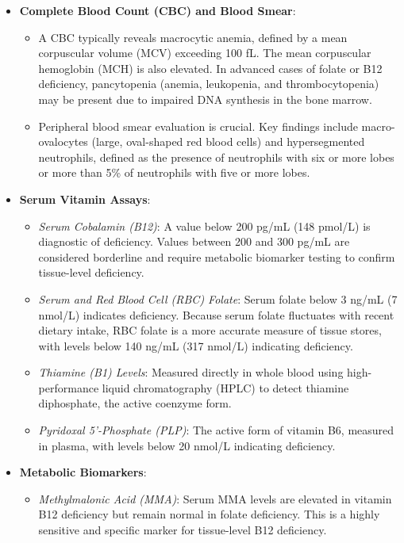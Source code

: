 \begin{itemize}
    \item \textbf{Complete Blood Count (CBC) and Blood Smear}:
    \begin{itemize}
        \item A CBC typically reveals macrocytic anemia, defined by a mean corpuscular volume (MCV) exceeding 100 fL. The mean corpuscular hemoglobin (MCH) is also elevated. In advanced cases of folate or B12 deficiency, pancytopenia (anemia, leukopenia, and thrombocytopenia) may be present due to impaired DNA synthesis in the bone marrow.
        \item Peripheral blood smear evaluation is crucial. Key findings include macro-ovalocytes (large, oval-shaped red blood cells) and hypersegmented neutrophils, defined as the presence of neutrophils with six or more lobes or more than 5\% of neutrophils with five or more lobes.
    \end{itemize}
    \item \textbf{Serum Vitamin Assays}:
    \begin{itemize}
        \item \textit{Serum Cobalamin (B12)}: A value below 200 pg/mL (148 pmol/L) is diagnostic of deficiency. Values between 200 and 300 pg/mL are considered borderline and require metabolic biomarker testing to confirm tissue-level deficiency.
        \item \textit{Serum and Red Blood Cell (RBC) Folate}: Serum folate below 3 ng/mL (7 nmol/L) indicates deficiency. Because serum folate fluctuates with recent dietary intake, RBC folate is a more accurate measure of tissue stores, with levels below 140 ng/mL (317 nmol/L) indicating deficiency.
        \item \textit{Thiamine (B1) Levels}: Measured directly in whole blood using high-performance liquid chromatography (HPLC) to detect thiamine diphosphate, the active coenzyme form.
        \item \textit{Pyridoxal 5'-Phosphate (PLP)}: The active form of vitamin B6, measured in plasma, with levels below 20 nmol/L indicating deficiency.
    \end{itemize}
    \item \textbf{Metabolic Biomarkers}:
    \begin{itemize}
        \item \textit{Methylmalonic Acid (MMA)}: Serum MMA levels are elevated in vitamin B12 deficiency but remain normal in folate deficiency. This is a highly sensitive and specific marker for tissue-level B12 deficiency.

\end{itemize}
\end{itemize}
